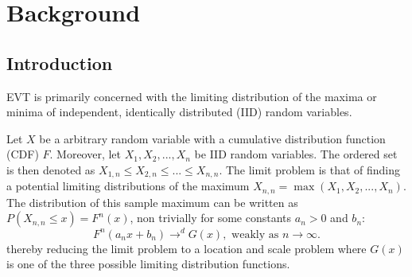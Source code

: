 \newpage
\chapter{Background}\label{chap2}
\section{Introduction}
EVT is primarily concerned with the limiting distribution of the maxima or minima of independent, identically distributed (IID) random variables.

Let $X$ be a arbitrary random variable with a cumulative distribution function (CDF) $F$. Moreover, let $X_1,X_2,...,X_n$ be IID random variables. The ordered set is then denoted as $X_{1,n} \leq X_{2,n} \leq...\leq X_{n,n}$. The limit problem is that of finding a potential limiting distributions of the maximum $X_{n,n} = \max(X_1,X_2,...,X_n)$. The distribution of this sample maximum can be written as $P(X_{n,n} \leq x) = F^n(x)$, non trivially for some constants $a_n>0$ and $b_n$: 
\begin{equation}\label{cond1}
F^n(a_n x+b_n) \rightarrow^d G(x), \text{ weakly as } n\rightarrow \infty.
\end{equation}thereby reducing the limit problem to a location and scale problem where $G(x)$ is one of the three possible limiting distribution functions. 

